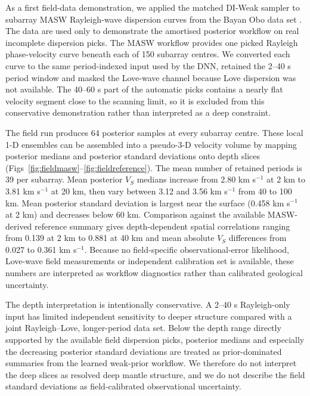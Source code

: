 \documentclass[referee]{gji}
\begin{document}
As a first field-data demonstration, we applied the matched DI-Weak sampler to subarray MASW Rayleigh-wave dispersion curves from the Bayan Obo data set \citep{Yang2025BayanOboDataset}. The data are used only to demonstrate the amortised posterior workflow on real incomplete dispersion picks. The MASW workflow provides one picked Rayleigh phase-velocity curve beneath each of 150 subarray centres. We converted each curve to the same period-indexed input used by the DNN, retained the 2--40 s period window and masked the Love-wave channel because Love dispersion was not available. The 40--60 s part of the automatic picks contains a nearly flat velocity segment close to the scanning limit, so it is excluded from this conservative demonstration rather than interpreted as a deep constraint.

The field run produces 64 posterior samples at every subarray centre. These local 1-D ensembles can be assembled into a pseudo-3-D velocity volume by mapping posterior medians and posterior standard deviations onto depth slices (Figs~\ref{fig:fieldmasw}--\ref{fig:fieldreference}). The mean number of retained periods is 39 per subarray. Mean posterior $V_S$ medians increase from 2.80 km s$^{-1}$ at 2 km to 3.81 km s$^{-1}$ at 20 km, then vary between 3.12 and 3.56 km s$^{-1}$ from 40 to 100 km. Mean posterior standard deviation is largest near the surface (0.458 km s$^{-1}$ at 2 km) and decreases below 60 km. Comparison against the available MASW-derived reference summary gives depth-dependent spatial correlations ranging from 0.139 at 2 km to 0.881 at 40 km and mean absolute $V_S$ differences from 0.027 to 0.361 km s$^{-1}$. Because no field-specific observational-error likelihood, Love-wave field measurements or independent calibration set is available, these numbers are interpreted as workflow diagnostics rather than calibrated geological uncertainty.

The depth interpretation is intentionally conservative. A 2--40 s Rayleigh-only input has limited independent sensitivity to deeper structure compared with a joint Rayleigh--Love, longer-period data set. Below the depth range directly supported by the available field dispersion picks, posterior medians and especially the decreasing posterior standard deviations are treated as prior-dominated summaries from the learned weak-prior workflow. We therefore do not interpret the deep slices as resolved deep mantle structure, and we do not describe the field standard deviations as field-calibrated observational uncertainty.
\end{document}
